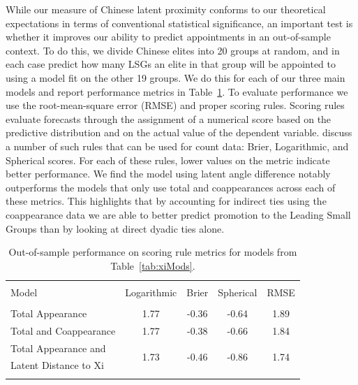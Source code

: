 \documentclass[11pt,english]{article}
\begin{document}
\begin{flushleft}
While our measure of Chinese latent proximity conforms to our theoretical expectations in terms of conventional statistical significance, an important test is whether it improves our ability to predict appointments in an out-of-sample context. To do this, we divide Chinese elites into 20 groups at random, and in each case predict how many LSGs an elite in that group will be appointed to using a model fit on the other 19 groups. We do this for each of our three main models and report performance metrics in Table~\ref{tab:xiModsPerf}. To evaluate performance we use the root-mean-square error (RMSE) and proper scoring rules. Scoring rules evaluate forecasts through the assignment of a numerical score based on the predictive distribution and on the actual value of the dependent variable. \citet{czado:etal:2009} discuss a number of such rules that can be used for count data: Brier, Logarithmic, and Spherical scores. For each of these rules, lower values on the metric indicate better performance. We find the model using latent angle difference notably outperforms the models that only use total and coappearances across each of these metrics. This highlights that by accounting for indirect ties using the coappearance data we are able to better predict promotion to the Leading Small Groups than by looking at direct dyadic ties alone.

\begin{table}[ht]
\centering
\begin{small}
\caption{Out-of-sample performance on scoring rule metrics for models from Table~\ref{tab:xiMods}.}
\label{tab:xiModsPerf}
  \begin{tabular}{lcccc}
  \\[-1.8ex]\hline
  \hline \\[-1.8ex]
  Model & Logarithmic & Brier & Spherical & RMSE\\    \hline \\[-1.8ex]
Total Appearance & 1.77 & -0.36 & -0.64 & 1.89 \\
Total and Coappearance & 1.77 & -0.38 & -0.66 & 1.84 \\
Total Appearance and  & \multirow{2}{*}{1.73} & \multirow{2}{*}{-0.46} & \multirow{2}{*}{-0.86} & \multirow{2}{*}{1.74} \\
  \;\;\; Latent Distance to Xi &  &  &  &  \\
    \hline
 \hline \\[-1.8ex]
\end{tabular}
\end{small}
\end{table}


\end{flushleft}
\end{document}
